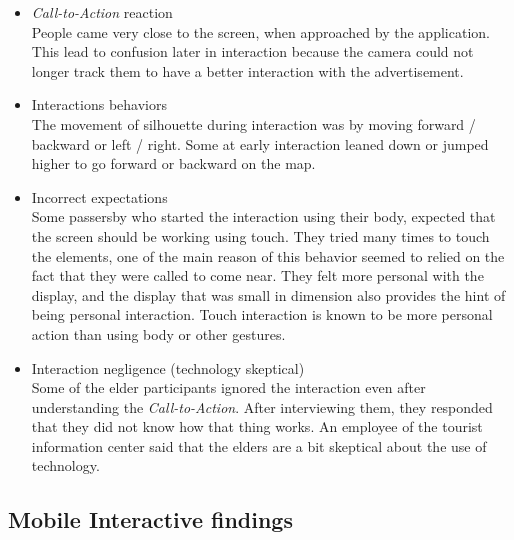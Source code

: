 \begin{enumerate}
\begin{itemize}
\item \emph{Call-to-Action} reaction \\
People came very close to the screen, when approached by the application. This lead to confusion later in interaction because the camera could not longer track them to have a better interaction with the advertisement.

\item Interactions behaviors \\
The movement of silhouette during interaction was by moving forward / backward or left / right. Some at early interaction leaned down or jumped higher to go forward or backward on the map.


\item Incorrect expectations \\
Some passersby who started the interaction using their body, expected that the screen should be working using touch. They tried many times to touch the elements, one of the main reason of this behavior seemed to relied on the fact that they were called to come near. They felt more personal with the display, and the display that was small in dimension also provides the hint of being personal interaction. Touch interaction is known to be more personal action than using body or other gestures. 

\item Interaction negligence (technology skeptical) \\
Some of the elder participants ignored the interaction even after understanding the \emph{Call-to-Action}. After interviewing them, they responded that they did not know how that thing works. An employee of the tourist information center said that the elders are a bit skeptical about the use of technology. 

\end{itemize}

\end{enumerate}







\newpage
\subsection{Mobile Interactive findings}

